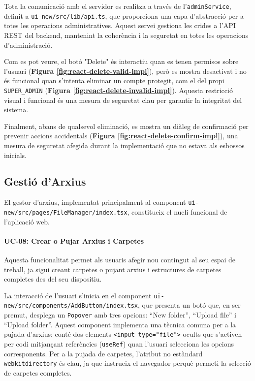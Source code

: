 Tota la comunicació amb el servidor es realitza a través de l'\texttt{adminService}, definit a \texttt{ui-new/src/lib/api.ts}, que proporciona una capa d'abstracció per a totes les operacions administratives. Aquest servei gestiona les crides a l'API REST del backend, mantenint la coherència i la seguretat en totes les operacions d'administració.

Com es pot veure, el botó "Delete" és interactiu quan es tenen permisos sobre l'usuari (\textbf{Figura \ref{fig:react-delete-valid-impl}}), però es mostra desactivat i no és funcional quan s'intenta eliminar un compte protegit, com el del propi \texttt{SUPER\_ADMIN} (\textbf{Figura \ref{fig:react-delete-invalid-impl}}). Aquesta restricció visual i funcional és una mesura de seguretat clau per garantir la integritat del sistema.

Finalment, abans de qualsevol eliminació, es mostra un diàleg de confirmació per prevenir accions accidentals (\textbf{Figura \ref{fig:react-delete-confirm-impl}}), una mesura de seguretat afegida durant la implementació que no estava als esbossos inicials.

\subsection{Gestió d'Arxius}
El gestor d'arxius, implementat principalment al component \texttt{ui-new/src/pages/FileManager/index.tsx}, constitueix el nucli funcional de l'aplicació web.

\paragraph{UC-08: Crear o Pujar Arxius i Carpetes}
Aquesta funcionalitat permet als usuaris afegir nou contingut al seu espai de treball, ja sigui creant carpetes o pujant arxius i estructures de carpetes completes des del seu dispositiu.

La interacció de l'usuari s'inicia en el component \texttt{ui-new/src/components/AddButton/index.tsx}, que presenta un botó que, en ser premut, desplega un \texttt{Popover} amb tres opcions: ``New folder'', ``Upload file'' i ``Upload folder''. Aquest component implementa una tècnica comuna per a la pujada d'arxius: conté dos elements \texttt{<input type="file">} ocults que s'activen per codi mitjançant referències (\texttt{useRef}) quan l'usuari selecciona les opcions corresponents. Per a la pujada de carpetes, l'atribut no estàndard \texttt{webkitdirectory} és clau, ja que instrueix el navegador perquè permeti la selecció de carpetes completes.

